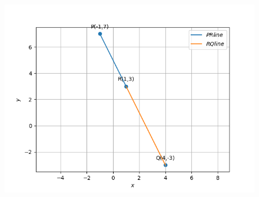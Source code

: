 \documentclass[12pt]{article}
\begin{document}
\begin{figure}[!h]
\begin{center}
   \includegraphics[width=\columnwidth]{./figs/linefig.png}
\end{center}
\caption{}
\label{fig:Fig}
\end{figure}
\end{document}
